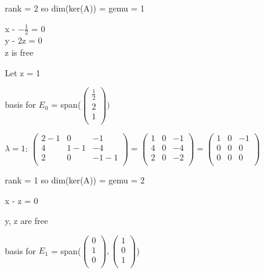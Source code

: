 \documentclass[12pt]{article}
\begin{document}
\begin{enumerate}
\begin{enumerate}[label=(\alph*)]
        rank = 2 so dim(ker(A)) = gemu = 1
        
        x - $-\frac{1}{2}$ = 0 \\
        y - 2z = 0 \\
        z is free

        Let z = 1

         basis for $E_0$ = span($\begin{pmatrix}
            \frac{1}{2} \\
            2 \\
            1 \\
        \end{pmatrix})$

    $\lambda = 1$: 
        $\begin{pmatrix}
            2 - 1 & 0 & -1 \\
            4 & 1 - 1 & -4\\
            2 & 0 & -1 - 1\\
        \end{pmatrix} = \begin{pmatrix}
            1 & 0 & -1 \\
            4 & 0 & -4\\
            2 & 0 & -2\\
        \end{pmatrix} = \begin{pmatrix}
            1 & 0 & -1 \\
            0 & 0 & 0\\
            0 & 0 & 0\\
        \end{pmatrix}$
        
        rank = 1 so dim(ker(A)) = gemu = 2

        x - z = 0

        y, z are free 

        basis for $E_1$ = span($\begin{pmatrix}
            0\\
            1 \\
            0 \\
        \end{pmatrix}, \begin{pmatrix}
            1\\
            0 \\
            1 \\
        \end{pmatrix}$)


\end{enumerate}
\end{enumerate}
\end{document}
